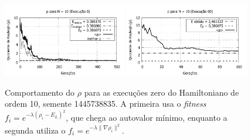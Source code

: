 	
	\begin{figure}[htbp]
		\centering
			\includegraphics[width=0.48\textwidth]{figs/resultados/fitnessEL/N-10_E-0_rho.pdf}
			\includegraphics[width=0.48\textwidth]{figs/resultados/fitnessGrad/N10_00_rho.pdf}
		\caption{Comportamento do $\rho$ para as execuções zero do Hamiltoniano de ordem 10, semente 1445738835. A primeira usa o \textit{fitness} $f_i = e^{-\lambda(\rho_i - E_L)^2}$, que chega ao autovalor mínimo, enquanto a segunda utiliza o $f_i = e^{-\lambda \| \nabla \rho_i \|^2}$.}
		\label{fig:N-10_E-0_rho_comparacao}
	\end{figure}
	
